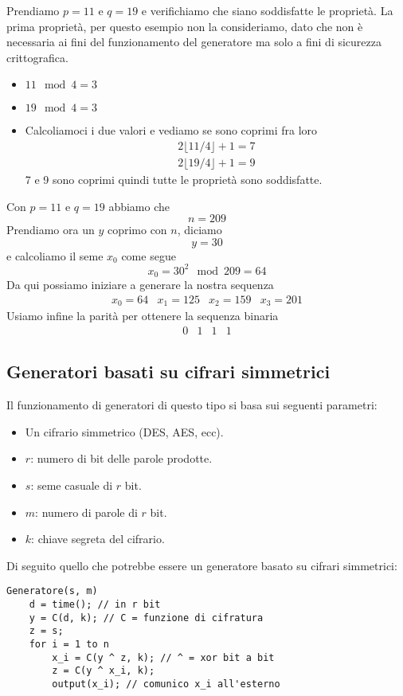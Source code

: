 \begin{example}
	Prendiamo $p = 11$ e $q = 19$ e verifichiamo che siano soddisfatte le propriet\`a. La prima propriet\`a, per questo
	esempio non la consideriamo, dato che non \`e necessaria ai fini del funzionamento del generatore ma solo a fini di
	sicurezza crittografica.
	\begin{itemize}
		\item $11 \mod{4} = 3$
		\item $19 \mod{4} = 3$
		\item Calcoliamoci i due valori e vediamo se sono coprimi fra loro
		      \begin{gather*}
			      2 \lfloor 11 / 4 \rfloor + 1 = 7 \\
			      2 \lfloor 19 / 4 \rfloor + 1 = 9
		      \end{gather*}
		      7 e 9 sono coprimi quindi tutte le propriet\`a sono soddisfatte.
	\end{itemize}
	Con $p = 11$ e $q = 19$ abbiamo che
	\[ n = 209 \]
	Prendiamo ora un $y$ coprimo con $n$, diciamo
	\[ y = 30 \]
	e calcoliamo il seme $x_0$ come segue
	\[ x_0 = 30^2 \mod{209} = 64 \]
	Da qui possiamo iniziare a generare la nostra sequenza
	\[ \begin{matrix} x_0 = 64 & x_1 = 125 & x_2 = 159 & x_3 = 201 \end{matrix} \]
	Usiamo infine la parit\`a per ottenere la sequenza binaria
	\[ \begin{matrix} 0 & 1 & 1 & 1 \end{matrix} \]
\end{example}

\subsection{Generatori basati su cifrari simmetrici}
Il funzionamento di generatori di questo tipo si basa sui seguenti parametri:
\begin{itemize}
	\item Un cifrario simmetrico (DES, AES, ecc).
	\item $r$: numero di bit delle parole prodotte.
	\item $s$: seme casuale di $r$ bit.
	\item $m$: numero di parole di $r$ bit.
	\item $k$: chiave segreta del cifrario.
\end{itemize}
Di seguito quello che potrebbe essere un generatore basato su cifrari simmetrici:
\begin{lstlisting}[style=pseudo-style]
Generatore(s, m)
	d = time(); // in r bit 
	y = C(d, k); // C = funzione di cifratura 
	z = s;
	for i = 1 to n
		x_i = C(y ^ z, k); // ^ = xor bit a bit
		z = C(y ^ x_i, k);
		output(x_i); // comunico x_i all'esterno
\end{lstlisting}